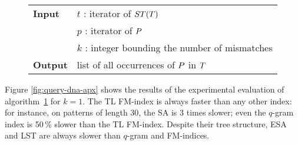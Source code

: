 \begin{figure*}[t]
\begin{center}
\begin{minipage}[t]{.8\textwidth}
\begin{algorithm}[H]
\begin{tabular}{ll}
\textbf{Input}  & $t$ : iterator of $ST(T)$\\
 			    & $p$ : iterator of $P$\\
 			    & $k$ : integer bounding the number of mismatches\\
\textbf{Output} & list of all occurrences of $P$ in $T$\\
\end{tabular}
\begin{algorithmic}[1]
\Else
		\State \Report {}
		\Repeat
			\State {}
			\State {}
			\State {}
		\Until {}
	\EndIf
\EndIf
\end{algorithmic}
\label{alg:st-hamming}
\end{algorithm}
\end{minipage}
\end{center}
\end{figure*}


%

Figure \ref{fig:query-dna-apx} shows the results of the experimental evaluation of algorithm~\ref{alg:st-hamming} for $k=1$.
The TL FM-index is always faster than any other index: for instance, on patterns of length 30, the SA is 3 times slower; even the $q$-gram index is 50\,\% slower than the TL FM-index.
Despite their tree structure, ESA and LST are always slower than $q$-gram and FM-indices.

